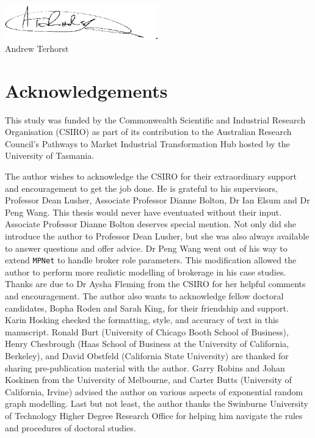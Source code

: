 \documentclass[12pt,table,xcdraw]{book}
\renewcommand{\today}{\the\day \ \monthname \ \the\year}
\begin{document}
\includegraphics[width = 0.5\textwidth]{Images/Signature.png}\\
Andrew Terhorst\\
\shortdate{\today}

\chapter*{Acknowledgements}

This study was funded by the Commonwealth Scientific and Industrial Research Organisation (CSIRO) as part of its contribution to the Australian Research Council's Pathways to Market Industrial Transformation Hub hosted by the University of Tasmania. \medskip

\noindent
The author wishes to acknowledge the CSIRO for their extraordinary support and encouragement to get the job done. He is grateful to his supervisors, Professor Dean Lusher, Associate Professor Dianne Bolton, Dr Ian Elsum and Dr Peng Wang. This thesis would never have eventuated without their input. Associate Professor Dianne Bolton deserves special mention. Not only did she introduce the author to Professor Dean Lusher, but she was also always available to answer questions and offer advice. Dr Peng Wang went out of his way to extend \texttt{MPNet} to handle broker role parameters. This modification allowed the author to perform more realistic modelling of brokerage in his case studies. Thanks are due to Dr Aysha Fleming from the CSIRO for her helpful comments and encouragement. The author also wants to acknowledge fellow doctoral candidates, Bopha Roden and Sarah King, for their friendship and support. Karin Hosking checked the formatting, style, and accuracy of text in this manuscript. Ronald Burt (University of Chicago Booth School of Business), Henry Chesbrough (Haas School of Business at the University of California, Berkeley), and David Obstfeld (California State University) are thanked for sharing pre-publication material with the author. Garry Robins and Johan Koskinen from the University of Melbourne, and Carter Butts (University of California, Irvine) advised the author on various aspects of exponential random graph modelling. Last but not least, the author thanks the Swinburne University of Technology Higher Degree Research Office for helping him navigate the rules and procedures of doctoral studies. \medskip
\end{document}
